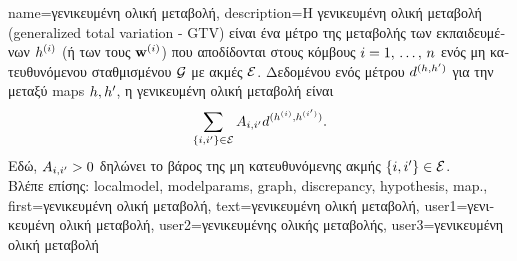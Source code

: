 {name={\foreignlanguage{greek}{γενικευμένη ολική μεταβολή}}, 
	description={\foreignlanguage{greek}{Η γενικευμένη ολική μεταβολή} (generalized total variation - GTV) 
		\foreignlanguage{greek}{είναι ένα μέτρο της μεταβολής των εκπαιδευμένων} 
		 $h^{(i)}$ (\foreignlanguage{greek}{ή των}  
		\foreignlanguage{greek}{τους} $\mathbf{w}^{(i)}$) \foreignlanguage{greek}{που αποδίδονται στους κόμβους 
		$i=1, \,\ldots, \,n$ ενός μη κατευθυνόμενου σταθμισμένου}  $\mathcal{G}$ 
		\foreignlanguage{greek}{με ακμές $\mathcal{E}$. Δεδομένου ενός μέτρου $d^{(h,h')}$ 
		για την}  \foreignlanguage{greek}{μεταξύ} \gls{map}s  
		$h,h'$, \foreignlanguage{greek}{η γενικευμένη ολική μεταβολή είναι}
		\begin{equation} 
			\nonumber
			\sum_{\{i,i'\}\in \mathcal{E}} A_{i,i'} 
			d^{(h^{(i)},h^{(i')})}.
		\end{equation}
		\foreignlanguage{greek}{Εδώ, $A_{i,i'}>0$ δηλώνει το βάρος της μη κατευθυνόμενης ακμής} 
		$\{i,i'\}\in \mathcal{E}$. \\
		\foreignlanguage{greek}{Βλέπε επίσης:} \gls{localmodel}, \gls{modelparams}, \gls{graph}, \gls{discrepancy}, \gls{hypothesis}, \gls{map}.},
	first={\foreignlanguage{greek}{γενικευμένη ολική μεταβολή}},
	text={\foreignlanguage{greek}{γενικευμένη ολική μεταβολή}},
	user1={\foreignlanguage{greek}{γενικευμένη ολική μεταβολή}}, %
  	user2={\foreignlanguage{greek}{γενικευμένης ολικής μεταβολής}}, %
	user3={\foreignlanguage{greek}{γενικευμένη ολική μεταβολή}} %
}

